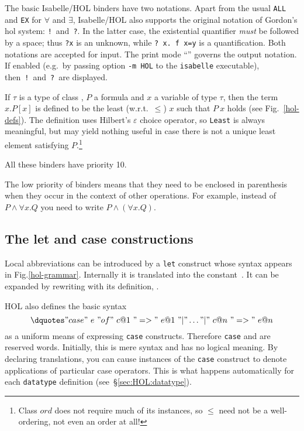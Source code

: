 \medskip

 The
basic Isabelle/HOL binders have two notations.  Apart from the usual
\texttt{ALL} and \texttt{EX} for $\forall$ and $\exists$, Isabelle/HOL also
supports the original notation of Gordon's {\sc hol} system: \texttt{!}\ 
and~\texttt{?}.  In the latter case, the existential quantifier \emph{must} be
followed by a space; thus {\tt?x} is an unknown, while \verb'? x. f x=y' is a
quantification.  Both notations are accepted for input.  The print mode
``\ttindexbold{HOL}'' governs the output notation.  If enabled (e.g.\ by
passing option \texttt{-m HOL} to the \texttt{isabelle} executable),
then~{\tt!}\ and~{\tt?}\ are displayed.

\medskip

If $\tau$ is a type of class , $P$ a formula and $x$ a
variable of type $\tau$, then the term \cdx{LEAST}~$x. P[x]$ is defined
to be the least (w.r.t.\ $\leq$) $x$ such that $P~x$ holds (see
Fig.~\ref{hol-defs}).  The definition uses Hilbert's $\varepsilon$
choice operator, so \texttt{Least} is always meaningful, but may yield
nothing useful in case there is not a unique least element satisfying
$P$.\footnote{Class $ord$ does not require much of its instances, so
  $\leq$ need not be a well-ordering, not even an order at all!}

\medskip All these binders have priority 10.

\begin{warn}
The low priority of binders means that they need to be enclosed in
parenthesis when they occur in the context of other operations.  For example,
instead of $P \land \forall x. Q$ you need to write $P \land (\forall x. Q)$.
\end{warn}


\subsection{The let and case constructions}
Local abbreviations can be introduced by a \texttt{let} construct whose
syntax appears in Fig.\ts\ref{hol-grammar}.  Internally it is translated into
the constant~\cdx{Let}.  It can be expanded by rewriting with its
definition, \tdx{Let_def}.

HOL also defines the basic syntax
\[\dquotes"case"~e~"of"~c@1~"=>"~e@1~"|" \dots "|"~c@n~"=>"~e@n\] 
as a uniform means of expressing \texttt{case} constructs.  Therefore \texttt{case}
and \sdx{of} are reserved words.  Initially, this is mere syntax and has no
logical meaning.  By declaring translations, you can cause instances of the
\texttt{case} construct to denote applications of particular case operators.
This is what happens automatically for each \texttt{datatype} definition
(see~{\S}\ref{sec:HOL:datatype}).

